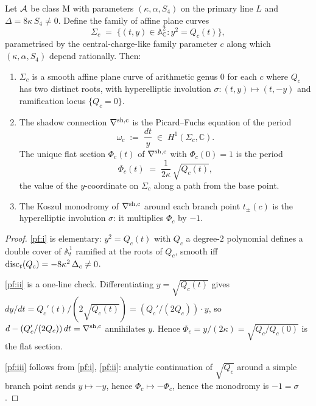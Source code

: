 \begin{theorem}
\label{thm:spectral-hyperelliptic-pf}
\ClaimStatusProvedHere
Let $\mathcal{A}$ be class M with parameters $(\kappa, \alpha, S_4)$ on the
primary line $L$ and $\Delta = 8\kappa\,S_4 \neq 0$. Define the
family of affine plane curves
\[
\Sigma_c \;=\; \bigl\{(t, y) \in \mathbb A^{2}_{\mathbb C}
 : y^{2} = Q_c(t)\bigr\},
\]
parametrised by the central-charge-like family parameter $c$ along
which $(\kappa, \alpha, S_4)$ depend rationally. Then:
\begin{enumerate}[label=\textup{(\roman*)}]
\item\label{pf:i} $\Sigma_c$ is a smooth affine plane curve of
arithmetic genus $0$ for each $c$ where $Q_c$ has two distinct
roots, with hyperelliptic involution $\sigma : (t, y) \mapsto (t, -y)$
and ramification locus $\{Q_c = 0\}$.
\item\label{pf:ii} The shadow connection $\nabla^{\rm sh, c}$ is the
Picard--Fuchs equation of the period
\[
\omega_c \;:=\; \frac{dt}{y} \;\in\; H^{1}(\Sigma_c,\mathbb C).
\]
The unique flat section $\Phi_c(t)$ of $\nabla^{\rm sh, c}$ with
$\Phi_c(0) = 1$ is the period
\[
\Phi_c(t) \;=\; \frac{1}{2\kappa}\,\sqrt{Q_c(t)},
\]
the value of the $y$-coordinate on $\Sigma_c$ along a path from the
base point.
\item\label{pf:iii} The Koszul monodromy of $\nabla^{\rm sh, c}$
around each branch point $t_\pm(c)$ is the hyperelliptic involution
$\sigma$: it multiplies $\Phi_c$ by $-1$.
\end{enumerate}
\end{theorem}

\begin{proof}
\ref{pf:i} is elementary: $y^{2} = Q_c(t)$ with $Q_c$ a degree-$2$
polynomial defines a double cover of $\mathbb A^{1}_{t}$ ramified at
the roots of $Q_c$, smooth iff
$\operatorname{disc}_{t}(Q_c) = -8\kappa^{2}\,\Delta_c \neq 0$.

\ref{pf:ii} is a one-line check. Differentiating
$y = \sqrt{Q_c(t)}$ gives
$dy/dt = Q_c'(t)/(2\sqrt{Q_c(t)}) = (Q_c'/(2 Q_c))\cdot y$, so
$d - (Q_c'/(2 Q_c))\,dt = \nabla^{\rm sh, c}$ annihilates $y$. Hence
$\Phi_c = y/(2\kappa) = \sqrt{Q_c/Q_c(0)}$ is the flat section.

\ref{pf:iii} follows from \ref{pf:i}, \ref{pf:ii}: analytic
continuation of $\sqrt{Q_c}$ around a simple branch point sends
$y \mapsto -y$, hence $\Phi_c \mapsto -\Phi_c$, hence the monodromy
is $-1 = \sigma$.
\end{proof}

